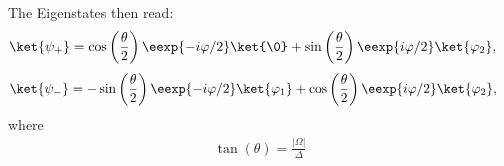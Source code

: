 The Eigenstates then read:
\begin{align}
				\ket{\psi_+}&=\cos\left(\frac{\theta}{2}\right) \eexp{-i{\varphi}/{2}}\ket{\0}+\sin\left(\frac{\theta}{2}\right) \eexp{i{\varphi}/{2}}\ket{\varphi_2}, \label{eq:staticpsiplus}
\end{align}
\begin{align}
				\ket{\psi_-}&=-\sin\left(\frac{\theta}{2}\right) \eexp{-i{\varphi}/{2}}\ket{\varphi_1}+\cos\left(\frac{\theta}{2}\right) \eexp{i{\varphi}/{2}}\ket{\varphi_2}, \label{eq:staticpsiminus}
\end{align}
where 
\begin{align} \label{eq:parameters}
	\tan(\theta) = \frac{|\Omega|}{\Delta} 
\end{align}